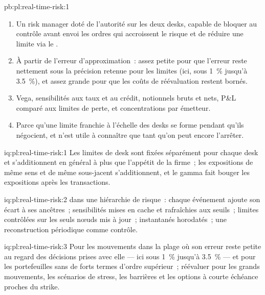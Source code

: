 \begin{solution}{pb:pl:real-time-risk:1}
\begin{enumerate}
1~\% de la réévaluation complète au-delà d'un mouvement de $+3.5~\%$ (ou $-6.75~\%$).
\item Un risk manager doté de l'autorité sur les deux desks, capable de bloquer au contrôle avant envoi les ordres qui accroissent le risque et de réduire une limite via le
.
\item À partir de l'erreur d'approximation~: assez petite pour que l'erreur reste nettement sous la précision retenue pour les limites (ici, sous 1~\% jusqu'à 3.5~\%),
et assez grande pour que les coûts de réévaluation restent bornés.
\item Vega, sensibilités aux taux et au crédit, notionnels bruts et nets, P\&L comparé aux limites de perte, et concentrations par émetteur.
\item Parce qu'une limite franchie à l'échelle des desks se forme pendant qu'ils négocient, et n'est utile à connaître que tant qu'on peut encore l'arrêter.
\end{enumerate}
\end{solution}

\begin{solution}{iq:pl:real-time-risk:1}
Les limites de desk sont fixées séparément pour chaque desk et s'additionnent en général à plus que l'appétit de la firme~; les expositions de même sens et de même
sous-jacent s'additionnent, et le gamma fait bouger les expositions après les transactions.
\end{solution}

\begin{solution}{iq:pl:real-time-risk:2}
 dans une hiérarchie de risque~: chaque événement ajoute son écart à ses ancêtres~; sensibilités mises en cache et rafraîchies aux seuils~;
limites contrôlées sur les seuls nœuds mis à jour~; instantanés horodatés~; une reconstruction périodique comme contrôle.
\end{solution}

\begin{solution}{iq:pl:real-time-risk:3}
Pour les mouvements dans la plage où son erreur reste petite au regard des décisions prises avec elle --- ici sous 1~\% jusqu'à 3.5~\% --- et pour les portefeuilles sans
de forts termes d'ordre supérieur~; réévaluer pour les grands mouvements, les scénarios de stress, les barrières et les options à courte échéance proches du strike.
\end{solution}

